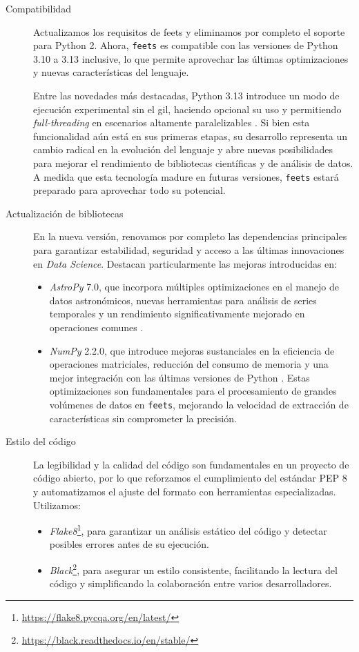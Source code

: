 \begin{description}
    \item[Compatibilidad] Actualizamos los requisitos de \gls{feets} y eliminamos por completo el soporte para Python 2. Ahora, \texttt{feets} es compatible con las versiones de Python 3.10 a 3.13 inclusive, lo que permite aprovechar las últimas optimizaciones y nuevas características del lenguaje.

    Entre las novedades más destacadas, Python 3.13 introduce un modo de ejecución experimental sin el \acrfull{gil}, haciendo opcional su uso y permitiendo \emph{full-threading} en escenarios altamente paralelizables \citep{gross2023nogil}. Si bien esta funcionalidad aún está en sus primeras etapas, su desarrollo representa un cambio radical en la evolución del lenguaje y abre nuevas posibilidades para mejorar el rendimiento de bibliotecas científicas y de análisis de datos. A medida que esta tecnología madure en futuras versiones, \texttt{feets} estará preparado para aprovechar todo su potencial.

    \item[Actualización de bibliotecas] En la nueva versión, renovamos por completo las dependencias principales para garantizar estabilidad, seguridad y acceso a las últimas innovaciones en \emph{Data Science}. Destacan particularmente las mejoras introducidas en:
    \begin{itemize}
        \item \emph{AstroPy} 7.0, que incorpora múltiples optimizaciones en el manejo de datos astronómicos, nuevas herramientas para análisis de series temporales y un rendimiento significativamente mejorado en operaciones comunes \citep{astropy2013astropy, astropy2018astropy, astropy2022astropy}.
        \item \emph{NumPy} 2.2.0, que introduce mejoras sustanciales en la eficiencia de operaciones matriciales, reducción del consumo de memoria y una mejor integración con las últimas versiones de Python \citep{harris2020array}. Estas optimizaciones son fundamentales para el procesamiento de grandes volúmenes de datos en \texttt{feets}, mejorando la velocidad de extracción de características sin comprometer la precisión.
    \end{itemize}

    \item[Estilo del código] La legibilidad y la calidad del código son fundamentales en un proyecto de código abierto, por lo que reforzamos el cumplimiento del estándar PEP 8 \citep{van2001pep8} y automatizamos el ajuste del formato con herramientas especializadas. Utilizamos:
    \begin{itemize}
        \item \emph{Flake8}\footnote{\url{https://flake8.pycqa.org/en/latest/}}, para garantizar un análisis estático del código y detectar posibles errores antes de su ejecución.
        \item \emph{Black}\footnote{\url{https://black.readthedocs.io/en/stable/}}, para asegurar un estilo consistente, facilitando la lectura del código y simplificando la colaboración entre varios desarrolladores.
    \end{itemize}


\end{description}
